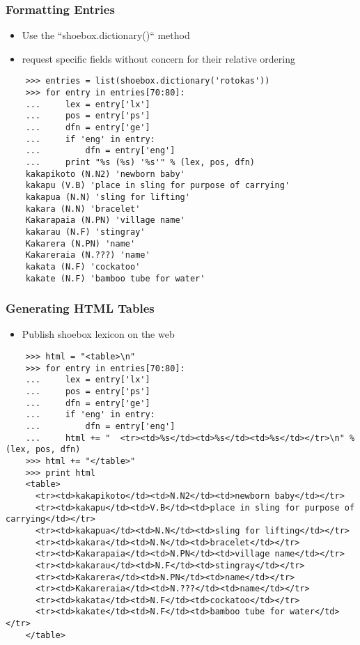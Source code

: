 \documentclass{beamer}
\begin{document}
\begin{frame}[fragile]
\frametitle{Formatting Entries}

\begin{itemize}
\item Use the ``shoebox.dictionary()`` method
\item request specific fields without concern for their relative
  ordering
\end{itemize}

\begin{verbatim}
    >>> entries = list(shoebox.dictionary('rotokas'))
    >>> for entry in entries[70:80]:
    ...     lex = entry['lx']
    ...     pos = entry['ps']
    ...     dfn = entry['ge']
    ...     if 'eng' in entry:
    ...         dfn = entry['eng']
    ...     print "%s (%s) '%s'" % (lex, pos, dfn)
    kakapikoto (N.N2) 'newborn baby'
    kakapu (V.B) 'place in sling for purpose of carrying'
    kakapua (N.N) 'sling for lifting'
    kakara (N.N) 'bracelet'
    Kakarapaia (N.PN) 'village name'
    kakarau (N.F) 'stingray'
    Kakarera (N.PN) 'name'
    Kakareraia (N.???) 'name'
    kakata (N.F) 'cockatoo'
    kakate (N.F) 'bamboo tube for water'
\end{verbatim}
\end{frame}

\begin{frame}[fragile]
\frametitle{Generating HTML Tables}
\scriptsize

\begin{itemize}
\item Publish shoebox lexicon on the web
\end{itemize}

\begin{verbatim}
    >>> html = "<table>\n"
    >>> for entry in entries[70:80]:
    ...     lex = entry['lx']
    ...     pos = entry['ps']
    ...     dfn = entry['ge']
    ...     if 'eng' in entry:
    ...         dfn = entry['eng']
    ...     html += "  <tr><td>%s</td><td>%s</td><td>%s</td></tr>\n" % (lex, pos, dfn)
    >>> html += "</table>"
    >>> print html
    <table>
      <tr><td>kakapikoto</td><td>N.N2</td><td>newborn baby</td></tr>
      <tr><td>kakapu</td><td>V.B</td><td>place in sling for purpose of carrying</td></tr>
      <tr><td>kakapua</td><td>N.N</td><td>sling for lifting</td></tr>
      <tr><td>kakara</td><td>N.N</td><td>bracelet</td></tr>
      <tr><td>Kakarapaia</td><td>N.PN</td><td>village name</td></tr>
      <tr><td>kakarau</td><td>N.F</td><td>stingray</td></tr>
      <tr><td>Kakarera</td><td>N.PN</td><td>name</td></tr>
      <tr><td>Kakareraia</td><td>N.???</td><td>name</td></tr>
      <tr><td>kakata</td><td>N.F</td><td>cockatoo</td></tr>
      <tr><td>kakate</td><td>N.F</td><td>bamboo tube for water</td></tr>
    </table>
\end{verbatim}
\end{frame}
\end{document}

